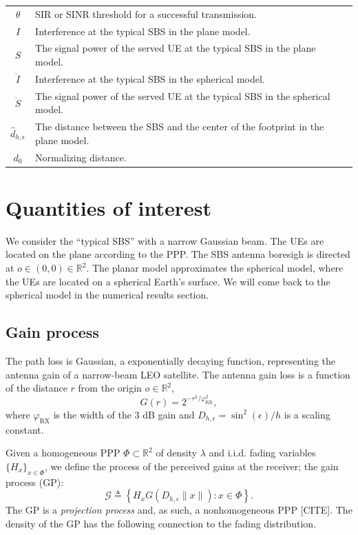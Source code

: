 \documentclass[lettersize,journal]{IEEEtran}
\newcommand{\R}{\mathbb{R}}
\begin{document}
\begin{table}
\begin{center}
\begin{tabular}{| c | p{4.5cm}  |p{1.5cm}|}
      $\theta$ & SIR or SINR threshold for a successful transmission.&\\
      $I$ & Interference at the typical SBS in the plane model.&\\
      $S$ & The signal power of the served UE at the typical SBS in the plane model.&\\
      $\mathring{I}$ & Interference at the typical SBS in the spherical model.&\\
      $\mathring{S}$ & The signal power of the served UE at the typical SBS in the spherical model.&\\ 
      $\hat{d}_{h,\epsilon}$ & The distance between the SBS and the center of the footprint in the plane model.&\\
      $d_{0}$ & Normalizing distance. & \\                        
      \hline
    \end{tabular}
  \end{center}
\end{table}   


\section{Quantities of interest}
We consider the ``typical SBS'' with a narrow Gaussian beam. The UEs are located on the plane according to the PPP. The SBS antenna boresigh is directed at $\textit{o} \in (0,0) \in \R^2$. The planar model approximates the spherical model, where the UEs are located on a spherical Earth's surface. We will come back to the spherical model in the numerical results section.



\subsection{Gain process}
The path loss is Gaussian, a exponentially decaying function, representing the antenna gain of a narrow-beam LEO satellite. The antenna gain loss is a function of the distance $r$ from the origin $\textit{o}\in \R^2$, 
\begin{equation}
  G(r) = 2^{-r^2/\varphi^2_{\text{RX}}},
\end{equation}
where $\varphi_{\text{RX}}$ is the width of the $3$ dB gain and $D_{h,\epsilon}=\sin^2(\epsilon)/h$ is a scaling constant. 

Given a homogeneous PPP $\Phi \subset \R^2$ of density $\lambda$ and i.i.d. fading variables $\{H_x\}_{x\in\Phi}$, we define the process of the perceived gains at the receiver; the gain process (GP):
\begin{equation}
  \label{eq:gainprocess}
  \mathcal{G} \triangleq \left\{ H_x G(D_{h,\epsilon}\|x\|):x \in \Phi  \right\}.
\end{equation}
The GP is a \textit{projection process} and, as such, a nonhomogeneous PPP [CITE]. The density of the GP has the following connection to the fading distribution.
\end{document}
